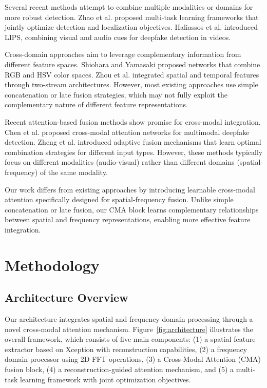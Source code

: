 \documentclass[letterpaper]{article} %
\begin{document}
Several recent methods attempt to combine multiple modalities or domains for more robust detection. Zhao et al. proposed multi-task learning frameworks that jointly optimize detection and localization objectives. Haliassos et al. introduced LIPS, combining visual and audio cues for deepfake detection in videos.

Cross-domain approaches aim to leverage complementary information from different feature spaces. Shiohara and Yamasaki proposed networks that combine RGB and HSV color spaces. Zhou et al. integrated spatial and temporal features through two-stream architectures. However, most existing approaches use simple concatenation or late fusion strategies, which may not fully exploit the complementary nature of different feature representations.

Recent attention-based fusion methods show promise for cross-modal integration. Chen et al. proposed cross-modal attention networks for multimodal deepfake detection. Zheng et al. introduced adaptive fusion mechanisms that learn optimal combination strategies for different input types. However, these methods typically focus on different modalities (audio-visual) rather than different domains (spatial-frequency) of the same modality.

Our work differs from existing approaches by introducing learnable cross-modal attention specifically designed for spatial-frequency fusion. Unlike simple concatenation or late fusion, our CMA block learns complementary relationships between spatial and frequency representations, enabling more effective feature integration.

\section{Methodology}

\subsection{Architecture Overview}

Our architecture integrates spatial and frequency domain processing through a novel cross-modal attention mechanism. Figure~\ref{fig:architecture} illustrates the overall framework, which consists of five main components: (1) a spatial feature extractor based on Xception with reconstruction capabilities, (2) a frequency domain processor using 2D FFT operations, (3) a Cross-Modal Attention (CMA) fusion block, (4) a reconstruction-guided attention mechanism, and (5) a multi-task learning framework with joint optimization objectives.
\end{document}
